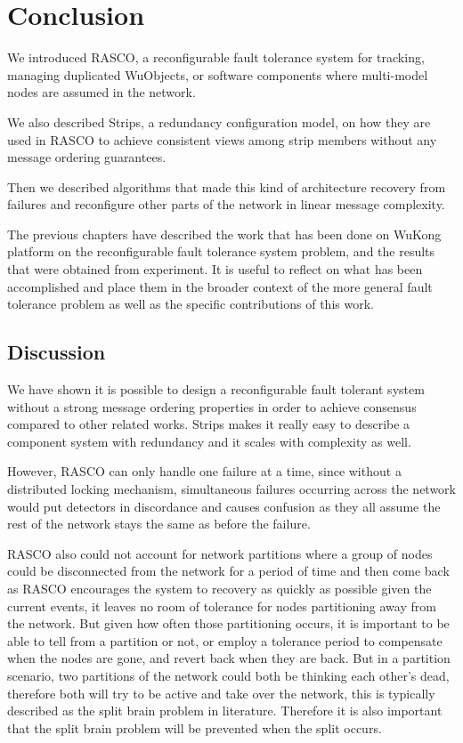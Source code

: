 \cleardoublepage
\singlespacing
\chapter{Conclusion}
\label{c:conclusion}
\doublespacing\nointerlineskip

We introduced RASCO, a reconfigurable fault tolerance system for tracking, managing duplicated WuObjects, or software components where multi-model nodes are assumed in the network.

We also described Strips, a redundancy configuration model, on how they are used in RASCO to achieve consistent views among strip members without any message ordering guarantees.

Then we described algorithms that made this kind of architecture recovery from failures and reconfigure other parts of the network in linear message complexity.

The previous chapters have described the work that has been done on WuKong
platform on the reconfigurable fault tolerance system problem, and the results
that were obtained from experiment. It is useful to reflect on what has been accomplished and place them in the broader context of the more general fault tolerance problem as well as the specific contributions of this work.

\section{Discussion}

We have shown it is possible to design a reconfigurable fault tolerant system without a strong message ordering properties in order to achieve consensus compared to other related works. Strips makes it really easy to describe a component system with redundancy and it scales with complexity as well.

However, RASCO can only handle one failure at a time, since without a distributed locking mechanism, simultaneous failures occurring across the network would put detectors in discordance and causes confusion as they all assume the rest of the network stays the same as before the failure. 

RASCO also could not account for network partitions where a group of nodes could be disconnected from the network for a period of time and then come back as RASCO encourages the system to recovery as quickly as possible given the current events, it leaves no room of tolerance for nodes partitioning away from the network. But given how often those partitioning occurs, it is important to be able to tell from a partition or not, or employ a tolerance period to compensate when the nodes are gone, and revert back when they are back. But in a partition scenario, two partitions of the network could both be thinking each other's dead, therefore both will try to be active and take over the network, this is typically described as the split brain problem in literature. Therefore it is also important that the split brain problem will be prevented when the split occurs.

